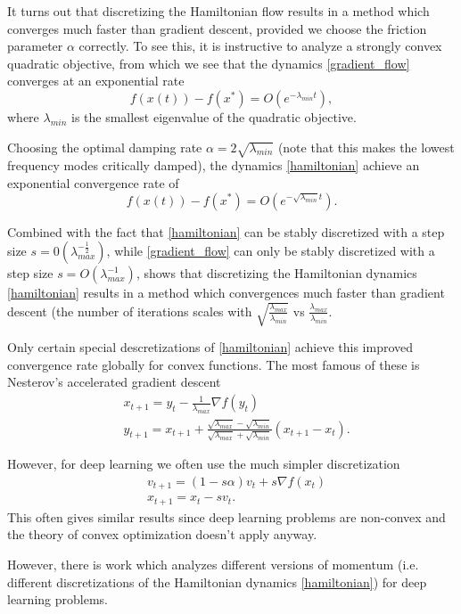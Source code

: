 It turns out that discretizing the Hamiltonian flow results in a method which converges much faster than gradient descent, provided we choose the friction parameter $\alpha$ correctly. To see this, it is instructive to analyze a strongly convex quadratic objective, from which we see that
the dynamics \eqref{gradient_flow} converges at an exponential rate
\begin{equation}
 f(x(t)) - f(x^*) = O(e^{-\lambda_{min} t}),
\end{equation}
where $\lambda_{min}$ is the smallest eigenvalue of the quadratic objective.

Choosing the optimal damping rate $\alpha = 2\sqrt{\lambda_{min}}$ (note that this makes the lowest frequency modes critically damped), the dynamics \eqref{hamiltonian} achieve an exponential convergence rate of
\begin{equation}
 f(x(t)) - f(x^*) = O(e^{-\sqrt{\lambda_{min}} t}).
\end{equation}

Combined with the fact that \eqref{hamiltonian} can be stably discretized with a step size $s = 0(\lambda_{max}^{-\frac{1}{2}})$, while \eqref{gradient_flow} can only be stably discretized with a step size $s = O(\lambda_{max}^{-1})$, shows that discretizing the Hamiltonian dynamics \eqref{hamiltonian} results in a method which convergences much faster than gradient descent (the number of iterations scales with $\sqrt{\frac{\lambda_{max}}{\lambda_{min}}}$ vs $\frac{\lambda_{max}}{\lambda_{min}}$.

Only certain special descretizations of \eqref{hamiltonian} achieve this improved convergence rate globally for convex functions. The most famous of these is Nesterov's accelerated gradient descent
\begin{equation}
 \begin{split}
  &x_{t+1} = y_t - \frac{1}{\lambda_{max}}\nabla f(y_t) \\
  &y_{t+1} = x_{t+1} + \frac{\sqrt{\lambda_{max}} - \sqrt{\lambda_{min}}}{\sqrt{\lambda_{max}} + \sqrt{\lambda_{min}}}(x_{t+1} - x_t).
 \end{split}
\end{equation}

However, for deep learning we often use the much simpler discretization
\begin{equation}
 \begin{split}
  &v_{t+1} = (1 - s\alpha) v_t + s\nabla f(x_t)\\
  &x_{t+1} = x_t - sv_t.
 \end{split}
\end{equation}
This often gives similar results since deep learning problems are non-convex and the theory of convex optimization doesn't apply anyway.

However, there is work which analyzes different versions of momentum (i.e. different discretizations of the Hamiltonian dynamics \eqref{hamiltonian}) for deep learning problems.


